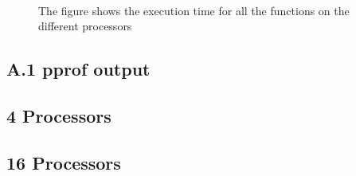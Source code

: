 \begin{figure}[h!] 
 \center 
  \\
 \caption{ The figure shows the execution time for all the functions on the different processors \label{fig:}}
 \end{figure}

\clearpage


\appendix

\subsection*{A.1 pprof output}
\subsection*{4 Processors}




\clearpage 
\subsection*{16 Processors}



















